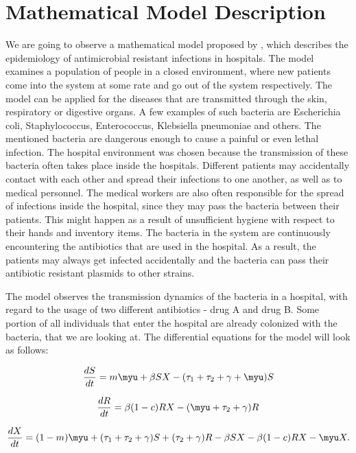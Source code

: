 \chapter*{Mathematical Model Description}


We are going to observe a mathematical model proposed by \cite{lips}, which describes the epidemiology of antimicrobial resistant infections in hospitals. The model examines a population of people in a closed environment, where new patients come into the system at some rate and go out of the system respectively. The model can be applied for the diseases that are transmitted through the skin, respiratory or digestive organs. A few examples of such bacteria are Escherichia coli, Staphylococcus, Enterococcus, Klebsiella pneumoniae and others. The mentioned bacteria are dangerous enough to cause a painful or even lethal infection. The hospital environment was chosen because the transmission of these bacteria often takes place inside the hospitals. Different patients may accidentally contact with each other and spread their infections to one another, as well as to medical personnel. The medical workers are also often responsible for the spread of infections inside the hospital, since they may pass the bacteria between their patients. This might happen as a result of unsufficient hygiene with respect to their hands and inventory items. The bacteria in the system are continuously encountering the antibiotics that are used in the hospital. As a result, the patients may always get infected accidentally and the bacteria can pass their antibiotic resistant plasmids to other strains.

The model observes the transmission dynamics of the bacteria in a hospital, with regard to the usage of two different antibiotics - drug A and drug B. Some portion of all individuals that enter the hospital are already colonized with the bacteria, that we are looking at. The differential equations for the model will look as follows:

\begin{equation}
\frac{dS}{dt} = m \myu + \beta S X - (\tau_1 + \tau_2 + \gamma + \myu) S
\end{equation}

\begin{equation}
\frac{dR}{dt} = \beta (1 - c) R X - (\myu + \tau_2 + \gamma) R
\end{equation}

\begin{equation}
\frac{dX}{dt} = (1 - m) \myu + (\tau_1 + \tau_2 + \gamma) S + (\tau_2 + \gamma) R - \beta S X - \beta (1-c) R X - \myu X.
\end{equation}